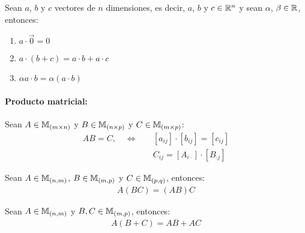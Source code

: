 \begin{teorema}
{
    \label{thm:2}
    Sean $a$, $b$ y $c$ vectores de $n$ dimensiones, es decir, $a$, $b$ y $c \in \mathbb{R}^n$ y sean $\alpha$, $\beta \in \mathbb{R}$, entonces: \\
    \begin{enumerate}
        \item $a \cdot \vec{0} = 0$
        \item $a \cdot (b + c) = a \cdot b + a \cdot c$
        \item $\alpha a \cdot b = \alpha (a \cdot b)$
    \end{enumerate}
}
\end{teorema}

\paragraph*{Producto matricial:}

Sean $A \in \mathbb{M}_{(m \times n)}$ y $B \in \mathbb{M}_{(n \times p)}$ y $C \in \mathbb{M}_{(m \times p)}$:
\begin{align*}
    AB = C, \quad \Longleftrightarrow \quad &\left[ a_{ij} \right] \cdot \left[ b_{ij} \right] = \left[ c_{ij} \right] \\
    &C_{ij} = \left[ A_{i\cdot} \right] \cdot \left[ B_{\cdot j} \right]
\end{align*}


\begin{teorema}
{
    \label{thm:3}
    Sean $A \in \mathbb{M}_{(n, m)}$, $B \in \mathbb{M}_{(m, p)}$ y $C \in \mathbb{M}_{(p, q)}$, entonces: \\
    \begin{align*}
        A(BC) = (AB)C
    \end{align*}
}
\end{teorema}

\begin{teorema}
{
    \label{thm:4}
    Sean $A \in \mathbb{M}_{(n, m)}$ y $B, C \in \mathbb{M}_{(m, p)}$, entonces: \\
    \begin{align*}
        A (B + C) = AB + AC
    \end{align*}
}
\end{teorema}


